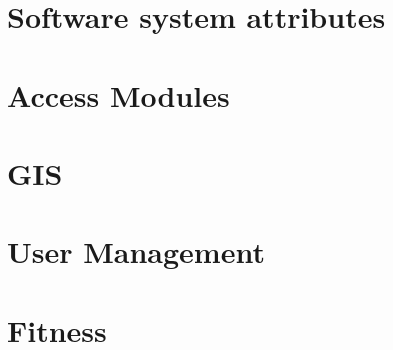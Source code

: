 \documentclass{article}
\begin{document}
\section{Software system attributes}
	
\clearpage

\section{Access Modules}
	
\clearpage

\section{GIS}
	
\clearpage

\section{User Management}
	
\clearpage

\section{Fitness}
	
\end{document}
